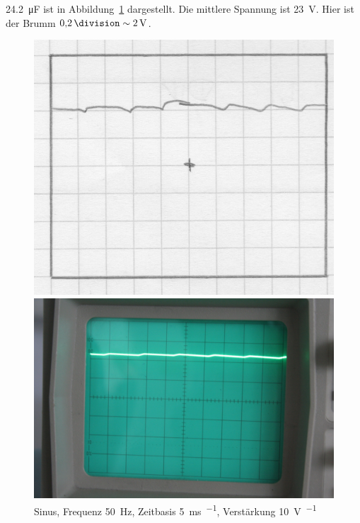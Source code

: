 \SI{24.2}{\micro\farad} ist in Abbildung~\ref{fig:798} dargestellt. Die
mittlere Spannung ist \SI{23}{\volt}. Hier ist der Brumm $\SI{.2}\division
\sim \SI 2\volt$.

\begin{figure}[htbp]
	\centering
	\begin{minipage}{.45\linewidth}
	\includegraphics[width=\linewidth]{Oszi_Hand/798.jpg}
	\end{minipage}
	\hfill
	\begin{minipage}{.45\linewidth}
	\includegraphics[width=\linewidth]{Oszi_Foto/798.jpg}
	\end{minipage}
	\caption{%
		Sinus, Frequenz \SI{50}{\hertz},
		Zeitbasis \SI{5}{\milli\second\per\division},
		Verstärkung \SI{10}{\volt\per\division}
	}
	\label{fig:798}
\end{figure}

